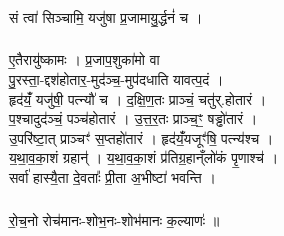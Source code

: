 \subsubsection{}
सं त्वा॑ सिञ्चामि॒ यजु॑षा प्र॒जामायु॒र्द्धनं॑ च ।\\



\subsubsection{}
ए॒तैरायु॑ष्कामः । प्र॒जाप॒शुका॑मो वा\\
पु॒रस्ता॒-द्दश॑होतार॒-मुद॑ञ्च॒-मुप॑दधाति यावत्प॒दं ।\\
हृद॑यंँ॒ यजु॑षी॒ पत्न्यौ॑ च । द॒क्षि॒ण॒तः प्राञ्चं॒ चतु॑र्.होतारं ।\\
प॒श्चादुद॑ञ्चं॒ पञ्च॑होतारं । उ॒त्त॒र॒तः प्राञ्च॒ꣳ॒ षड्ढो॑तारं ।\\
उ॒परि॑ष्टा॒त् प्राञ्चꣳ॑ स॒प्तहो॑तारं । हृद॑यंँ॒यजूꣳ॑षि॒ पत्न्य॑श्च ।\\
य॒था॒व॒का॒शं ग्रहान्॑ । य॒था॒व॒का॒शं प्र॑तिग्र॒हान्ँलो॑कं पृ॒णाश्च॑ ।\\
सर्वा॑ हास्यै॒ता दे॒वताः᳚ प्री॒ता अ॒भीष्टा॑ भवन्ति । \\
\subsubsection{}
रो॒च॒नो रोच॑मानः-शोभ॒नः-शोभ॑मानः क॒ल्याणः॑ ॥\\




